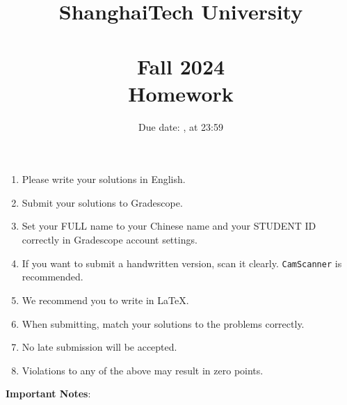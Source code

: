 \documentclass[11pt, addpoints, answers]{exam}
\title{
    \vspace{25pt}
    \LARGE ShanghaiTech University \\
    \bigskip
    \textbf{\CourseName} \\
    \textbf{Fall 2024}   \\
    \bigskip
    Homework \HomeworkNO
}
\author{}
\date{Due date: \DueDate, at 23:59}
\newcommand{\ttt}{\texttt}
\begin{document}
\maketitle

\vspace{50pt}

\begin{enumerate}
    \item Please write your solutions in English.
    \item Submit your solutions to Gradescope.
    \item Set your FULL name to your Chinese name and your STUDENT ID correctly in Gradescope account settings.
    \item If you want to submit a handwritten version, scan it clearly. \ttt{CamScanner} is recommended.
    \item We recommend you to write in LaTeX.
    \item When submitting, match your solutions to the problems correctly.
    \item No late submission will be accepted.
    \item Violations to any of the above may result in zero points.
\end{enumerate}

\newpage


{\large\textbf{Important Notes}:}
\end{document}
